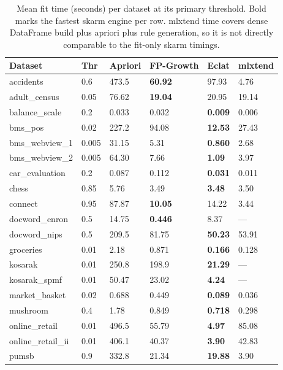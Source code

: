 \documentclass[journal,a4paper]{IEEEtran}
\begin{document}
\begin{table}[t]
\centering
\scriptsize
\caption{Mean fit time (seconds) per dataset at its primary threshold. Bold marks the fastest skarm engine per row. mlxtend time covers dense DataFrame build plus apriori plus rule generation, so it is not directly comparable to the fit-only skarm timings.}
\label{tab:timing}
\begin{tabular}{llllll}
\toprule
Dataset & Thr & Apriori & FP-Growth & Eclat & mlxtend \\
\midrule
accidents & 0.6 & 473.5 & \textbf{60.92} & 97.93 & 4.76 \\
adult\_\allowbreak{}census & 0.05 & 76.62 & \textbf{19.04} & 20.95 & 19.14 \\
balance\_\allowbreak{}scale & 0.2 & 0.033 & 0.032 & \textbf{0.009} & 0.006 \\
bms\_\allowbreak{}pos & 0.02 & 227.2 & 94.08 & \textbf{12.53} & 27.43 \\
bms\_\allowbreak{}webview\_\allowbreak{}1 & 0.005 & 31.15 & 5.31 & \textbf{0.860} & 2.68 \\
bms\_\allowbreak{}webview\_\allowbreak{}2 & 0.005 & 64.30 & 7.66 & \textbf{1.09} & 3.97 \\
car\_\allowbreak{}evaluation & 0.2 & 0.087 & 0.112 & \textbf{0.031} & 0.011 \\
chess & 0.85 & 5.76 & 3.49 & \textbf{3.48} & 3.50 \\
connect & 0.95 & 87.87 & \textbf{10.05} & 14.22 & 3.44 \\
docword\_\allowbreak{}enron & 0.5 & 14.75 & \textbf{0.446} & 8.37 & --- \\
docword\_\allowbreak{}nips & 0.5 & 209.5 & 81.75 & \textbf{50.23} & 53.91 \\
groceries & 0.01 & 2.18 & 0.871 & \textbf{0.166} & 0.128 \\
kosarak & 0.01 & 250.8 & 198.9 & \textbf{21.29} & --- \\
kosarak\_\allowbreak{}spmf & 0.01 & 50.47 & 23.02 & \textbf{4.24} & --- \\
market\_\allowbreak{}basket & 0.02 & 0.688 & 0.449 & \textbf{0.089} & 0.036 \\
mushroom & 0.4 & 1.78 & 0.849 & \textbf{0.718} & 0.298 \\
online\_\allowbreak{}retail & 0.01 & 496.5 & 55.79 & \textbf{4.97} & 85.08 \\
online\_\allowbreak{}retail\_\allowbreak{}ii & 0.01 & 406.1 & 40.37 & \textbf{3.90} & 42.83 \\
pumsb & 0.9 & 332.8 & 21.34 & \textbf{19.88} & 3.90 \\

\end{tabular}
\end{table}
\end{document}
